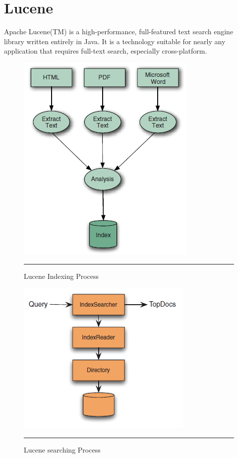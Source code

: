 \section{Lucene}\label{lucene}
\label{luceneTool}
Apache Lucene(TM) is a high-performance, full-featured text search engine library written entirely in Java. It is a technology suitable for nearly any application that requires full-text search, especially cross-platform.
\begin{figure}[htbp]
	\begin{center}
		\includegraphics{./Figures/lucene.png}
		\rule{20em}{0.5pt}
	\end{center}
	\caption[Lucene Indexing Process]{Lucene Indexing Process}
	\label{fig:lucene1}
\end{figure}
\begin{figure}[htbp]
	\begin{center}
		\includegraphics{./Figures/lucene_search.png}
		\rule{20em}{0.5pt}
	\end{center}
	\caption[Lucene searching Process]{Lucene searching Process}
	\label{fig:lucene2}
\end{figure}
